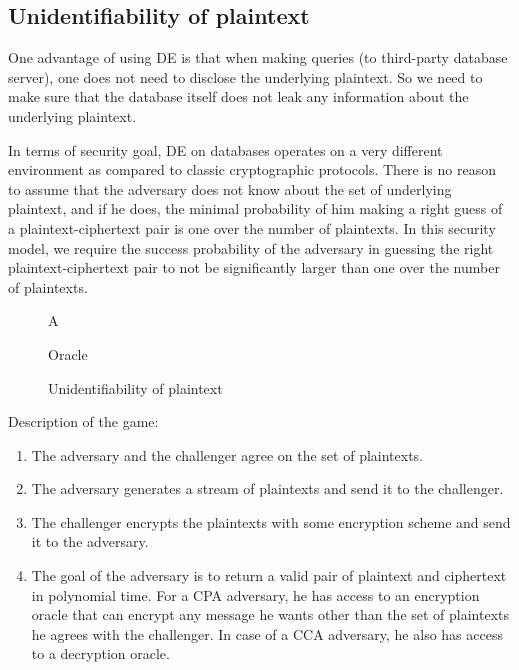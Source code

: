 \documentclass[10pt]{article}
\begin{document}
\subsection{Unidentifiability of plaintext}
One advantage of using DE is that when making queries (to third-party database server), one does not need to disclose the underlying plaintext. So we need to make sure that the database itself does not leak any information about the underlying plaintext.

In terms of security goal, DE on databases operates on a very different environment as compared to classic cryptographic protocols. There is no reason to assume that the adversary does not know about the set of underlying plaintext, and if he does, the minimal probability of him making a right guess of a plaintext-ciphertext pair is one over the number of plaintexts. In this security model, we require the success probability of the adversary in guessing the right plaintext-ciphertext pair to not be significantly larger than one over the number of plaintexts.

\begin{figure}[H]
\begin{center}
\begin{bbrenv}{A}
\begin{bbrbox}[name = Adversary, minheight=3.5cm, minwidth = 2.5cm]
\end{bbrbox}
		
\bbrmsgspace{1cm}
\bbrmsgspace{1cm}
		
		
\begin{bbroracle}{Oracle}
\begin{bbrbox}[name = Encryption, minheight = 1cm]
\end{bbrbox}
\end{bbroracle}
\bbroracleqryspace{0.1cm}
\bbroracleqryspace{0.5cm}
\end{bbrenv}
	
\caption{Unidentifiability of plaintext}
\end{center}
\end{figure}

Description of the game:
\begin{enumerate}
\item The adversary and the challenger agree on the set of plaintexts.
\item The adversary generates a stream of plaintexts and send it to the challenger.
\item The challenger encrypts the plaintexts with some encryption scheme and send it to the adversary.
\item The goal of the adversary is to return a valid pair of plaintext and ciphertext in polynomial time. For a CPA adversary, he has access to an encryption oracle that can encrypt any message he wants other than the set of plaintexts he agrees with the challenger. In case of a CCA adversary, he also has access to a decryption oracle.
\end{enumerate}
\end{document}
